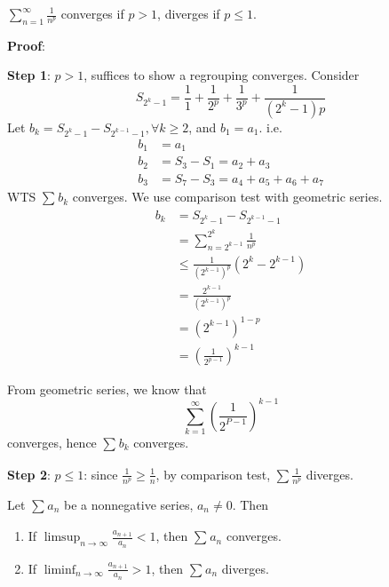 \begin{example}[$p$-series]
    $\sum\limits_{n=1}^{\infty}  \frac{1}{n^{p}}$
    converges if $p > 1$, diverges if $ p \leq 1$. 
    \medskip 

    \textbf{Proof}: 
    \medskip

    \textbf{Step 1}: $p > 1$,
    suffices to show a regrouping converges.
    Consider 
    \[
        S_{2^{k} - 1} = \frac{1}{1} + \frac{1}{2^{p}}
        + \frac{1}{3^{p}} 
        + \frac{1}{(2^{k} - 1)p}
    \]
    Let $b_k = S_{2^{k} - 1} - S_{2^{k-1}-1}, \forall k \geq 2$, and $b_1 = a_1$.
    i.e. 
    \begin{align*}
        b_1 &= a_1 \\
        b_2 &= S_3 - S_1 = a_2 + a_3 \\
        b_3 &= S_7 - S_3 = a_4 + a_5 + a_6 + a_7
    \end{align*}
    WTS $\sum\limits_{}^{} b_k $ converges.
    We use comparison test with geometric series.
    \begin{align*}
        b_k &= S_{2^k- 1} - S_{2^{k-1} - 1} \\
        &= \sum\limits_{n = 2^{k-1}}^{2^k}  \frac{1}{n^{p}} \\
        & \leq \frac{1}{(2^{k-1})^p} (2^{k} - 2^{k-1} ) \\
        & =\frac{2^{k-1}}{(2^{k-1})^p} \\
        &= (2^{k-1})^{1-p}  \\
        &= \left( \frac{1}{2^{p-1}} \right)^{k-1}
    \end{align*}

    From geometric series, we know that 
    \[
        \sum\limits_{k=1}^{\infty}  \left( 
            \frac{1}{2^{P - 1}}
        \right)^{k-1}
    \]
    converges, hence $\sum\limits_{}^{} b_k$ converges.
    \medskip

    \textbf{Step 2}: $p \leq 1$: since $ \frac{1}{n^{p}} \geq \frac{1}{n}$,
    by comparison test, $ \sum \frac{1}{n^{p}}$ diverges.
\end{example}

\begin{theorem}
    \label{thm:nonnegative-series-4}
    Let $\sum\limits_{}^{} a_n$ be a nonnegative series, $a_n \neq 0$. Then 
    \begin{enumerate}
        \item If $\limsup_{n \to \infty} \frac{ a_{n + 1}}{a_n} < 1$, then 
        $\sum\limits_{}^{} a_n$ converges.
        \item If $\liminf_{n \to \infty} \frac{a_{n + 1}}{a_n} > 1$, then 
        $\sum\limits_{}^{} a_n$ diverges.
    \end{enumerate} 
\end{theorem}

